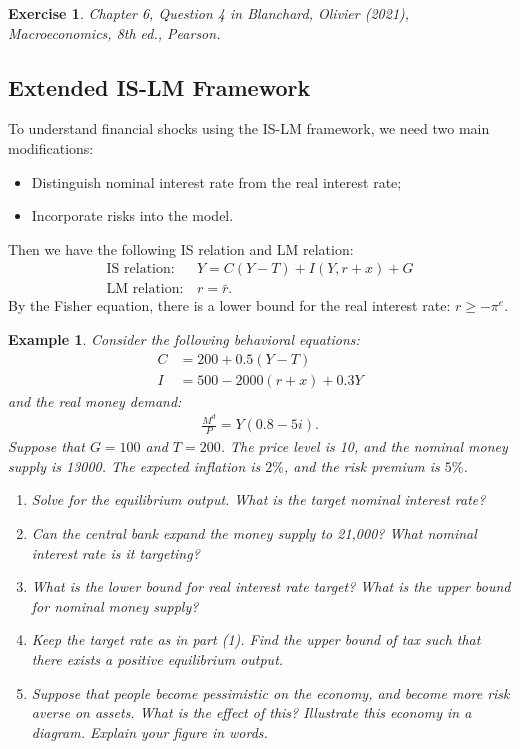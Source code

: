 \documentclass[12pt]{article}
\newtheorem{example}{Example}
\newtheorem{exercise}{Exercise}
\begin{document}
\begin{exercise}
    Chapter 6, Question 4 in Blanchard, Olivier (2021), \textit{Macroeconomics}, 8th ed., Pearson.
\end{exercise}

\subsection*{Extended IS-LM Framework}
To understand financial shocks using the IS-LM framework, we need two main modifications:
\begin{itemize}
    \item Distinguish nominal interest rate from the real interest rate;
    \item Incorporate risks into the model.
\end{itemize}
Then we have the following IS relation and LM relation:
\begin{align*}
    \text{IS relation}: &\, Y = C(Y-T) + I(Y, r+x) + G\\
    \text{LM relation}: &\, r = \bar{r}.
\end{align*}
By the Fisher equation, there is a lower bound for the real interest rate: $r \geq -\pi^e$.

\begin{example}
    Consider the following behavioral equations:
    \begin{align*}
        C &= 200 + 0.5(Y-T)\\
        I &= 500 - 2000(r+x) + 0.3Y
    \end{align*}
    and the real money demand:
    \begin{align*}
        \frac{M^d}{P} = Y(0.8-5i).
    \end{align*}
    Suppose that $G = 100$ and $T = 200$. The price level is 10, and the nominal money supply is 13000. The expected inflation is $2\%$, and the risk premium is $5\%$.
    \begin{enumerate}[label=(\arabic*)]
        \item Solve for the equilibrium output. What is the target nominal interest rate?
        \item Can the central bank expand the money supply to 21,000? What nominal interest rate is it targeting?
        \item What is the lower bound for real interest rate target? What is the upper bound for nominal money supply?
        \item Keep the target rate as in part (1). Find the upper bound of tax such that there exists a positive equilibrium output.
        \item Suppose that people become pessimistic on the economy, and become more risk averse on assets. What is the effect of this? Illustrate this economy in a diagram. Explain your figure in words.
    \end{enumerate}
\end{example}
\end{document}
